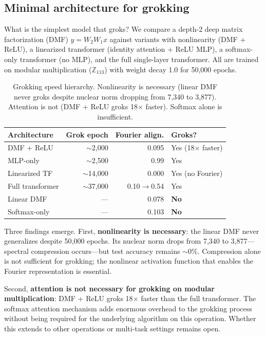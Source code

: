 \documentclass{article}
\newcommand{\Z}{\mathbb{Z}}
\begin{document}
\subsection{Minimal architecture for grokking}
\label{sec:dmf}

What is the simplest model that groks? We compare a depth-2 deep matrix
factorization (DMF) $y = W_2 W_1 x$ against variants with nonlinearity
(DMF + ReLU), a linearized transformer (identity attention + ReLU MLP),
a softmax-only transformer (no MLP), and the full single-layer transformer.
All are trained on modular multiplication ($\Z_{113}$) with weight decay 1.0
for 50{,}000 epochs.

\begin{table}[t]
\centering
\small
\begin{tabular}{lrrl}
\toprule
Architecture & Grok epoch & Fourier align. & Groks? \\
\midrule
DMF + ReLU     & $\sim$2{,}000   & 0.095 & Yes (18$\times$ faster) \\
MLP-only       & $\sim$2{,}500   & 0.99  & Yes \\
Linearized TF  & $\sim$14{,}000  & 0.000 & Yes (no Fourier) \\
Full transformer & $\sim$37{,}000 & 0.10$\to$0.54 & Yes \\
Linear DMF     & ---          & 0.078 & \textbf{No} \\
Softmax-only   & ---          & 0.103 & \textbf{No} \\
\bottomrule
\end{tabular}
\caption{Grokking speed hierarchy. Nonlinearity is necessary (linear DMF never
groks despite nuclear norm dropping from 7{,}340 to 3{,}877). Attention is not
(DMF + ReLU groks 18$\times$ faster). Softmax alone is insufficient.}
\label{tab:grokking_speed}
\end{table}

Three findings emerge. First, \textbf{nonlinearity is necessary}: the linear
DMF never generalizes despite 50{,}000 epochs. Its nuclear norm drops from
7{,}340 to 3{,}877---spectral compression occurs---but test accuracy remains
$\sim$0\%. Compression alone is not sufficient for grokking; the nonlinear
activation function that enables the Fourier representation is essential.

Second, \textbf{attention is not necessary for grokking on modular
multiplication}: DMF + ReLU groks 18$\times$ faster than the full
transformer. The softmax attention mechanism adds enormous overhead to the
grokking process without being required for the underlying algorithm on this
operation. Whether this extends to other operations or multi-task settings
remains open.
\end{document}
